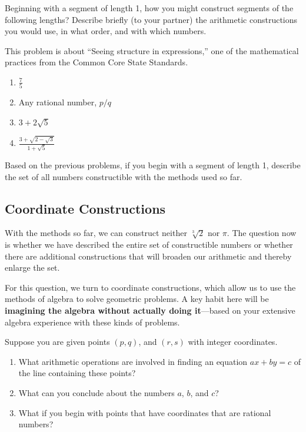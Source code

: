 \documentclass[nooutcomes,instructornotes]{ximera}
\begin{document}
\newpage
\begin{problem}
Beginning with a segment of length 1, how you might construct segments of the following lengths?  Describe briefly (to your partner) the arithmetic constructions you would use, in what order, and with which numbers.  
\begin{teachingnote}
This problem is about ``Seeing structure in expressions,'' one of the mathematical practices from the Common Core State Standards.
\end{teachingnote}
\begin{enumerate}
\item $\frac{7}{5}$
\item Any rational number, $p/q$
\item $3+2\sqrt{5}$
\item $\frac{3 + \sqrt{2-\sqrt{3}}}{1+\sqrt{5}}$
\end{enumerate}
\vspace{0.5in}
\end{problem}

\begin{problem}
Based on the previous problems, if you begin with a segment of length 1, describe the set of all numbers constructible with the methods used so far.   
\vfill
\end{problem}

\subsection*{Coordinate Constructions}
With the methods so far, we can construct neither $\sqrt[3]{2}$ nor $\pi$.  The question now is whether we have described the entire set of constructible numbers or whether there are additional constructions that will broaden our arithmetic and thereby enlarge the set.  

For this question, we turn to coordinate constructions, which allow us to use the methods of algebra to solve geometric problems.  A key habit here will be \textbf{imagining the algebra without actually doing it}---based on your extensive algebra experience with these kinds of problems.  

\newpage

\begin{problem}
Suppose you are given points $(p, q)$, and $(r, s)$ with integer coordinates.  
\begin{enumerate}
\item What arithmetic operations are involved in finding an equation $ax+by=c$ of the line containing these points?  
\item What can you conclude about the numbers $a$, $b$, and $c$? 
\item What if you begin with points that have coordinates that are rational numbers?  
\end{enumerate}
\vfill
\end{problem}
\end{document}

